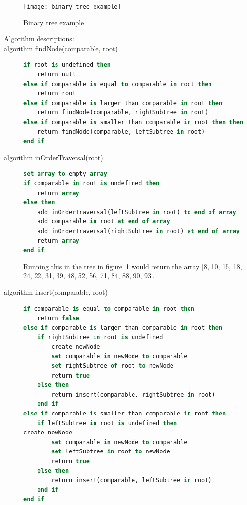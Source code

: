 \documentclass {article}
\begin{document}
\begin{figure}[H]
\texttt{[image: binary-tree-example]}


\caption {Binary tree example}
\label{fig:binary-tree-example}
\end {figure}

\begin{description}
\item[Algorithm descriptions:]
\item [algorithm findNode(comparable, root)]
\item[]
\begin{lstlisting}[language=Pascal]
if root is undefined then
	return null
else if comparable is equal to comparable in root then
 	return root
else if comparable is larger than comparable in root then
 	return findNode(comparable, rightSubtree in root)
else if comparable is smaller than comparable in root then then
 	return findNode(comparable, leftSubtree in root)
end if
\end{lstlisting}

\item [algorithm inOrderTraversal(root)]
\item []
\begin{lstlisting}[language=Pascal]
set array to empty array
if comparable in root is undefined then
 	return array
else then
 	add inOrderTraversal(leftSubtree in root) to end of array
 	add comparable in root at end of array
 	add inOrderTraversal(rightSubtree in root) at end of array
 	return array
end if
\end{lstlisting}

\item[] Running this in the tree in figure~\ref{fig:binary-tree-example} would return the array [8, 10, 15, 18, 24, 22, 31, 39, 48, 52, 56, 71, 84, 88, 90, 93].

\item [algorithm insert(comparable, root)]
\item []
\begin{lstlisting}[language=Pascal]
if comparable is equal to comparable in root then
  	return false
else if comparable is larger than comparable in root then
	if rightSubtree in root is undefined
		create newNode
		set comparable in newNode to comparable
		set rightSubtree of root to newNode
		return true
	else then
  		return insert(comparable, rightSubtree in root)
 	end if
else if comparable is smaller than comparable in root then 
 	if leftSubtree in root is undefined then 
create newNode
 		set comparable in newNode to comparable
 		set leftSubtree in root to newNode
 		return true
 	else then
 		return insert(comparable, leftSubtree in root)
 	end if
end if
\end{lstlisting}
\end{description}
\end{document}
